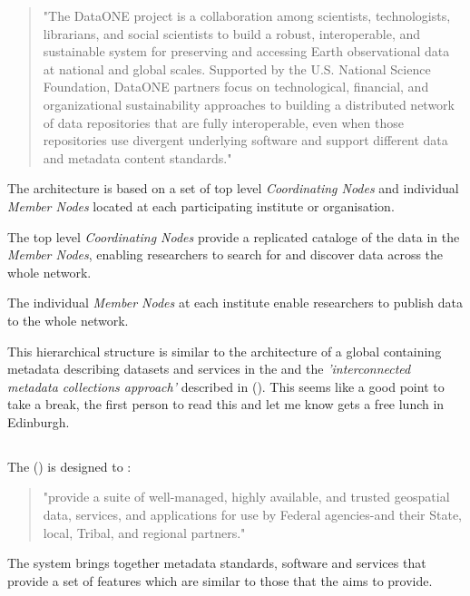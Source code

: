 \documentclass{article}
\begin{document}
\begin{quote}
"The DataONE project is a collaboration among scientists, technologists,
librarians, and social scientists to build a robust, interoperable,
and sustainable system for preserving and accessing Earth observational
data at national and global scales. Supported by the U.S. National
Science Foundation, DataONE partners focus on technological, financial,
and organizational sustainability approaches to building a distributed
network of data repositories that are fully interoperable, even when those
repositories use divergent underlying software and support different data
and metadata content standards."
\end{quote}

The \cite{data-one} architecture is based on a set of top level
\textit{Coordinating Nodes} and individual \textit{Member Nodes} located
at each participating institute or organisation.

The top level \textit{Coordinating Nodes} provide a replicated cataloge of
the data in the \textit{Member Nodes}, enabling researchers to search for
and discover data across the whole network.

The individual \textit{Member Nodes} at each institute enable researchers
to publish data to the whole \cite{data-one} network.

This hierarchical structure is similar to the \cite{vo} architecture of a global
\cite{ivoa-reg} containing metadata describing datasets and services in the
\cite{vo} and the \textit{'interconnected metadata collections approach'}
described in  (\cite{jones-2006}). This seems like
a good point to take a break, the first person to read this and let me know
gets a free lunch in Edinburgh.

\subsection{}

The  (\cite{fgdc})  is designed to :

\begin{quote}
"provide a suite of well-managed, highly available, and trusted geospatial 
data, services, and applications for use by Federal agencies-and their State,
local, Tribal, and regional partners."
\end{quote}

The \cite{fgdc-geo} system brings together metadata standards, software
and services that provide a set of features which are similar to those that
the \cite{trop} aims to provide.
\end{document}
